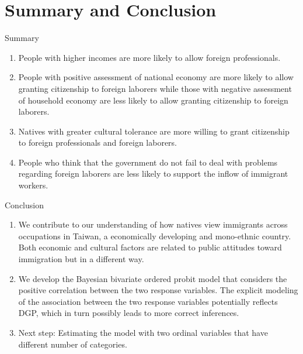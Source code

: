 \documentclass[12pt]{beamer}
\begin{document}
\section{Summary and Conclusion}
\begin{frame}{Summary}
\begin{enumerate}
\item People with higher incomes are more likely to allow foreign professionals. 
\item People with positive assessment of national economy are more likely to allow granting citizenship to foreign laborers while those with negative assessment of household economy are less likely to allow granting citizenship to foreign laborers. 
\item Natives with greater cultural tolerance are more willing to grant citizenship to foreign professionals and foreign laborers. 
\item People who think that the government do not fail to deal with problems regarding foreign laborers are less likely to support the inflow of immigrant workers.
\end{enumerate}
\end{frame}
\begin{frame}{Conclusion}
\begin{enumerate}
\item We contribute to our understanding of how natives view immigrants across occupations in Taiwan, a economically developing and mono-ethnic country. Both economic and cultural factors are related to public attitudes toward immigration but in a different way. 
\item  We develop  the Bayesian bivariate ordered probit model that considers the positive correlation between the two response variables. The explicit modeling of the association between the two response variables potentially reflects DGP, which in turn possibly leads to more correct inferences.
\item Next step: Estimating the model with two ordinal variables that have different number of categories.
\end{enumerate}
\end{frame}
\end{document}
